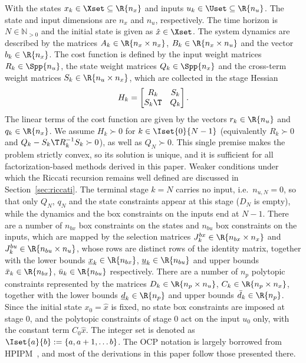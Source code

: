 With the states $x_k \in\Xset\subseteq\R{n_x}$ and inputs $u_k \in\Uset\subseteq\R{n_u}$.
The state and input dimensions are $n_x$ and $n_u$, respectively.
The time horizon is $N \in \mathbb{N}_{>0}$ and the initial state is given as $\hat{x} \in \Xset$. %
The system dynamics are described by the matrices $A_k \in \R{n_x \times n_x}$, $B_k \in \R{n_x \times n_u}$ and the vector $b_k \in \R{n_x}$.
The cost function is defined by the input weight matrices $R_k \in \Spp{n_u}$, the state weight matrices $Q_k \in \Spp{n_x}$ and the cross-term weight matrices $S_k \in \R{n_u \times n_x}$, which are collected in the stage Hessian
\[
H_k = \begin{bmatrix} R_k & S_k \\ S_k\T & Q_k \end{bmatrix}.
\]
The linear terms of the cost function are given by the vectors $r_k \in \R{n_u}$ and $q_k \in \R{n_x}$.
We assume $H_k \succ 0$ for $k \in \Iset{0}{N-1}$ (equivalently $R_k \succ 0$ and $Q_k - S_k\T R_k^{-1} S_k \succ 0$), as well as $Q_N \succ 0$.
This single premise makes the problem strictly convex, so its solution is unique, and it is sufficient for all factorization-based methods derived in this paper.
Weaker conditions under which the Riccati recursion remains well defined are discussed in Section~\ref{sec:riccati}.
The terminal stage $k=N$ carries no input, i.e.\ $n_{u,N} = 0$, so that only $Q_N$, $q_N$ and the state constraints appear at this stage ($D_N$ is empty), while the dynamics and the box constraints on the inputs end at $N-1$.
There are a number of $n_{bx}$ box constraints on the states and $n_{bu}$ box constraints on the inputs, which are mapped by the selection matrices $J_k^{bx}\in\R{n_{bx} \times n_x}$ and $J_k^{bu}\in\R{n_{bu} \times n_u}$, whose rows are distinct rows of the identity matrix, together with the lower bounds $\underline{x}_k\in\R{n_{bx}}$, $\underline{u}_k\in\R{n_{bu}}$ and upper bounds $\bar{x}_k\in\R{n_{bx}}$, $\bar{u}_k\in\R{n_{bu}}$ respectively.
There are a number of $n_p$ polytopic constraints represented by the matrices $D_k\in\R{n_p \times n_u}$, $C_k\in\R{n_p \times n_x}$, together with the lower bounds $\underline{d}_k\in\R{n_p}$ and upper bounds $\bar{d}_k\in\R{n_p}$.
Since the initial state $x_0 = \hat{x}$ is fixed, no state box constraints are imposed at stage $0$, and the polytopic constraints of stage $0$ act on the input $u_0$ only, with the constant term $C_0 \hat{x}$.
The integer set is denoted as $\Iset{a}{b} := \lbrace a, a+1, \dots b \rbrace$.
The OCP notation is largely borrowed from HPIPM~\cite{frison2020hpipm}, and most of the derivations in this paper follow those presented there.

\newpage